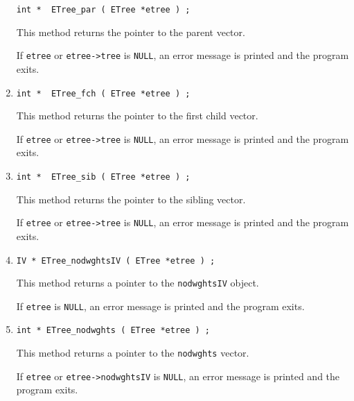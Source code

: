 \begin{enumerate}
\begin{verbatim}
int *  ETree_par ( ETree *etree ) ;
\end{verbatim}
This method returns the pointer to the parent vector.
\par {}
If {\tt etree} or {\tt etree->tree} is {\tt NULL},
an error message is printed and the program exits.
\item
\begin{verbatim}
int *  ETree_fch ( ETree *etree ) ;
\end{verbatim}
This method returns the pointer to the first child vector.
\par {}
If {\tt etree} or {\tt etree->tree} is {\tt NULL},
an error message is printed and the program exits.
\item
\begin{verbatim}
int *  ETree_sib ( ETree *etree ) ;
\end{verbatim}
This method returns the pointer to the sibling vector.
\par {}
If {\tt etree} or {\tt etree->tree} is {\tt NULL},
an error message is printed and the program exits.
\item
\begin{verbatim}
IV * ETree_nodwghtsIV ( ETree *etree ) ;
\end{verbatim}
This method returns a pointer to the {\tt nodwghtsIV} object.
\par {}
If {\tt etree} is {\tt NULL},
an error message is printed and the program exits.
\item
\begin{verbatim}
int * ETree_nodwghts ( ETree *etree ) ;
\end{verbatim}
This method returns a pointer to the {\tt nodwghts} vector.
\par {}
If {\tt etree} or {\tt etree->nodwghtsIV} is {\tt NULL},
an error message is printed and the program exits.

\end{enumerate}
